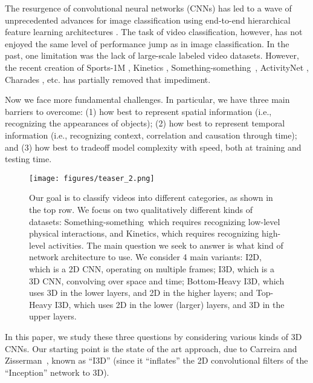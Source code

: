 \documentclass[runningheads]{llncs}
\newcommand{\Something}{Something-something}
\begin{document}
The resurgence of convolutional neural networks (CNNs) has led to a wave of unprecedented advances for image classification using end-to-end hierarchical feature learning architectures \cite{krizhevsky2012imagenet,InceptionV1,simonyan2015very,resnet}. The task of video classification, however, has not enjoyed the same level of performance jump as in image classification.
In the past, one limitation was the lack of large-scale labeled video datasets.
However, the recent creation of
Sports-1M \cite{Karpathy2014},
Kinetics \cite{kay2017kinetics},
\Something\ \cite{Something},
ActivityNet \cite{ActivityNet},
Charades \cite{Charades}, etc.
has partially removed that impediment.

Now we face more fundamental challenges.
In particular, we have three main barriers to overcome: (1) 
how best to represent  spatial information (i.e., recognizing the appearances of objects);
(2) how best to represent temporal information
(i.e., recognizing  context, correlation and causation through time);
and (3) 
how best to tradeoff model complexity with speed,
 both at training and testing time.



\begin{figure}[t]
\centering
\texttt{[image: figures/teaser\_2.png]}
\caption{
Our goal is to classify videos into different categories, as shown in the top row.
We focus on two qualitatively different kinds of datasets:
\Something\, which requires recognizing low-level physical interactions,
and Kinetics, which requires recognizing high-level activities.
The main question we seek to answer is what kind of network architecture to use.
We consider 4 main variants:
I2D, which is a 2D CNN, operating on multiple frames;
I3D, which is a 3D CNN, convolving over space and time;
Bottom-Heavy I3D, which uses 3D in the lower layers, and 2D in the higher layers;
and 
Top-Heavy I3D, which uses 2D in the lower (larger) layers,
and 3D in the upper layers.
}
\label{fig:teaser}
\end{figure}


In this paper, we study these three questions by considering various kinds of 3D CNNs.
Our starting point is the state of the art approach, due to
Carreira and Zisserman~\cite{carreira2017quo},
known as ``I3D'' 
(since it ``inflates'' the 2D convolutional filters of the
``Inception'' network \cite{InceptionV1} to 3D).
\end{document}
